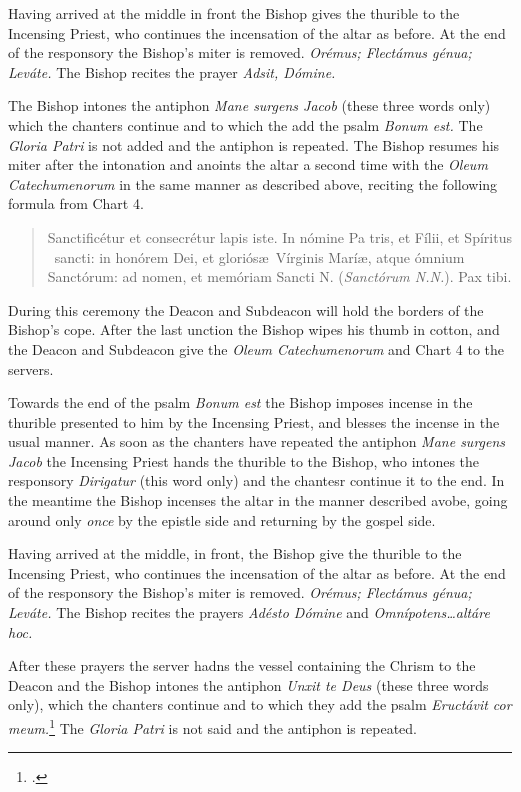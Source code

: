 \documentclass[letterpaper]{report}
\begin{document}
{\rubric Having arrived at the middle in front the Bishop gives the thurible to
the Incensing Priest, who continues the incensation of the altar as before. At
the end of the responsory the Bishop's miter is removed. \textit{Orémus;
Flectámus génua; Leváte.} The Bishop recites the prayer \textit{Adsit, Dómine.}

\rubric The Bishop intones the antiphon \textit{Mane surgens Jacob} (these
three words only) which the chanters continue and to which the add the psalm
\textit{Bonum est.} The \textit{Gloria Patri} is not added and the antiphon is
repeated. The Bishop resumes his miter after the intonation and anoints the
altar a second time with the \textit{Oleum Catechumenorum} in the same manner
as described above, reciting the following formula from Chart 4.

\begin{quote}
    Sancti\cross ficétur et conse\cross crétur lapis iste. In nómine Pa\cross
    tris, et Fí\cross lii, et Spíritus \cross\ sancti: in honórem Dei, et
    gloriós\ae\ Vírginis Marí\ae, atque ómnium Sanctórum: ad nomen, et memóriam
    Sancti N. (\textit{Sanctórum N.N.}). Pax tibi.
\end{quote}

During this ceremony the Deacon and Subdeacon will hold the borders of the
Bishop's cope. After the last unction the Bishop wipes his thumb in cotton, and
the Deacon and Subdeacon give the \textit{Oleum Catechumenorum} and Chart 4 to
the servers.

\rubric Towards the end of the psalm \textit{Bonum est} the Bishop imposes
incense in the thurible presented to him by the Incensing Priest, and blesses
the incense in the usual manner. As soon as the chanters have repeated the
antiphon \textit{Mane surgens Jacob} the Incensing Priest hands the thurible to
the Bishop, who intones the responsory \textit{Dirigatur} (this word only) and
the chantesr continue it to the end. In the meantime the Bishop incenses the
altar in the manner described avobe, going around only \textit{once} by the
epistle side and returning by the gospel side.

\rubric Having arrived at the middle, in front, the Bishop give the thurible to
the Incensing Priest, who continues the incensation of the altar as before. At
the end of the responsory the Bishop's miter is removed. \textit{Orémus;
Flectámus génua; Leváte.} The Bishop recites the prayers \textit{Adésto Dómine}
and \textit{Omnípotens\dots altáre hoc.}

\rubric After these prayers the server hadns the vessel containing the Chrism
to the Deacon and the Bishop intones the antiphon \textit{Unxit te Deus} (these
three words only), which the chanters continue and to which they add the psalm
\textit{Eructávit cor meum.}\footcite[The antiphon \textit{Unxit te Deus} may
be repested after each verse of this psalm.][footnote 1, p. 104.]{consecranda}
The \textit{Gloria Patri} is not said and the antiphon is repeated.

}
\end{document}
